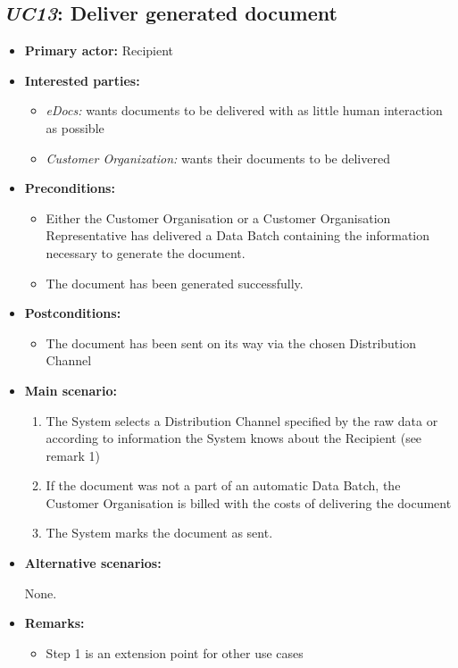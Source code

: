 \documentclass[a4paper,10pt]{article}
\begin{document}
\subsection{\emph{UC13}: Deliver generated document}
\begin{itemize}
    \item \textbf{Primary actor:} Recipient
    \item \textbf{Interested parties:} 
        \begin{itemize}
            \item \textit{eDocs:} wants documents to be delivered with as little human interaction as possible
            \item \textit{Customer Organization:} wants their documents to be delivered
        \end{itemize}

    \item \textbf{Preconditions:}
        \begin{itemize}
            \item Either the Customer Organisation or a Customer Organisation Representative has delivered a Data Batch containing the information necessary to generate the document.
            \item The document has been generated successfully.
        \end{itemize}

    \item \textbf{Postconditions:}
        \begin{itemize}
            \item The document has been sent on its way via the chosen Distribution Channel
        \end{itemize}
        
    \item \textbf{Main scenario:} 
    \begin{enumerate}
       \item The System selects a Distribution Channel specified by the raw data or according to information the System knows about the Recipient (see remark 1)
       \item If the document was not a part of an automatic Data Batch, the Customer Organisation is billed with the costs of delivering the document
       \item The System marks the document as sent.
    \end{enumerate}

    \item \textbf{Alternative scenarios:} 
    \begin{enumerate}
        None.
    \end{enumerate}
    
    \item \textbf{Remarks:}
        \begin{itemize}
            \item Step 1 is an extension point for other use cases
        \end{itemize}
\end{itemize}
\end{document}
